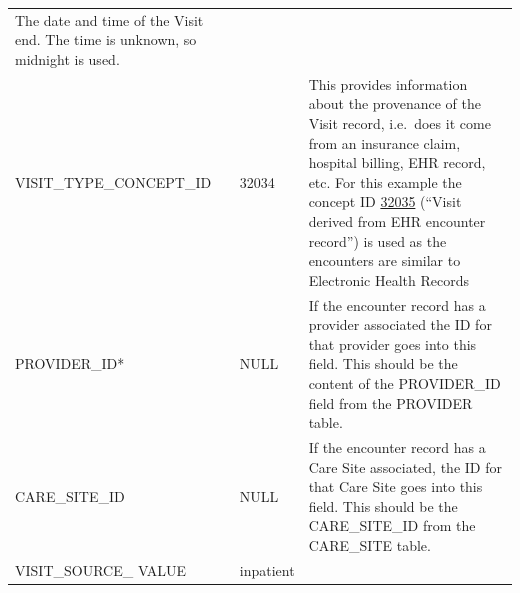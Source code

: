 \documentclass[11pt]{book}
\theoremstyle{definition}
\theoremstyle{definition}
\theoremstyle{definition}
\theoremstyle{remark}
\begin{document}
\begin{longtable}[]{@{}lll@{}}
\begin{minipage}[t]{0.49\columnwidth}
The date and time of the Visit end. The time is unknown, so midnight is used.\strut
\end{minipage}\tabularnewline
\begin{minipage}[t]{0.28\columnwidth}\raggedright
VISIT\_TYPE\_CONCEPT\_ID\strut
\end{minipage} & \begin{minipage}[t]{0.15\columnwidth}\raggedright
32034\strut
\end{minipage} & \begin{minipage}[t]{0.49\columnwidth}\raggedright
This provides information about the provenance of the Visit record, i.e.~does it come from an insurance claim, hospital billing, EHR record, etc. For this example the concept ID \href{http://athena.ohdsi.org/search-terms/terms/32035}{32035} (``Visit derived from EHR encounter record'') is used as the encounters are similar to Electronic Health Records\strut
\end{minipage}\tabularnewline
\begin{minipage}[t]{0.28\columnwidth}\raggedright
PROVIDER\_ID*\strut
\end{minipage} & \begin{minipage}[t]{0.15\columnwidth}\raggedright
NULL\strut
\end{minipage} & \begin{minipage}[t]{0.49\columnwidth}\raggedright
If the encounter record has a provider associated the ID for that provider goes into this field. This should be the content of the PROVIDER\_ID field from the PROVIDER table.\strut
\end{minipage}\tabularnewline
\begin{minipage}[t]{0.28\columnwidth}\raggedright
CARE\_SITE\_ID\strut
\end{minipage} & \begin{minipage}[t]{0.15\columnwidth}\raggedright
NULL\strut
\end{minipage} & \begin{minipage}[t]{0.49\columnwidth}\raggedright
If the encounter record has a Care Site associated, the ID for that Care Site goes into this field. This should be the CARE\_SITE\_ID from the CARE\_SITE table.\strut
\end{minipage}\tabularnewline
\begin{minipage}[t]{0.28\columnwidth}\raggedright
VISIT\_SOURCE\_ VALUE\strut
\end{minipage} & \begin{minipage}[t]{0.15\columnwidth}\raggedright
inpatient\strut

\end{minipage}
\end{longtable}
\end{document}
